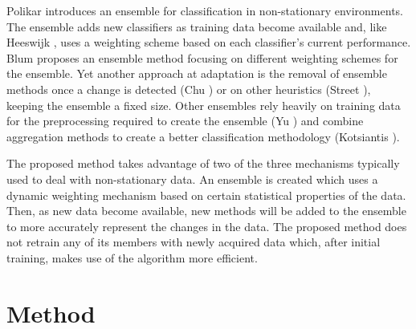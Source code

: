 \documentclass{article}
\begin{document}
Polikar \citep{muhlbaier2007ensemble} introduces an ensemble for classification in non-stationary environments. The ensemble adds new classifiers as training data become available and, like Heeswijk \citep{van2009adaptive}, uses a weighting scheme based on each classifier's current performance. Blum \citep{blum1995empirical} proposes an ensemble method focusing on different weighting schemes for the ensemble. Yet another approach at adaptation is the removal of ensemble methods once a change is detected (Chu \citep{chu2004fast}) or on other heuristics (Street \citep{street2001streaming}), keeping the ensemble a fixed size. Other ensembles rely heavily on training data for the preprocessing required to create the ensemble (Yu \citep{yu2008forecasting}) and combine aggregation methods to create a better classification methodology (Kotsiantis \citep{kotsiantis2010combinational}).

The proposed method takes advantage of two of the three mechanisms typically used to deal with non-stationary data. An ensemble is created which uses a dynamic weighting mechanism based on certain statistical properties of the data. Then, as new data become available, new methods will be added to the ensemble to more accurately represent the changes in the data. The proposed method does not retrain any of its members with newly acquired data which, after initial training, makes use of the algorithm more efficient. 


\section{Method}
\end{document}
